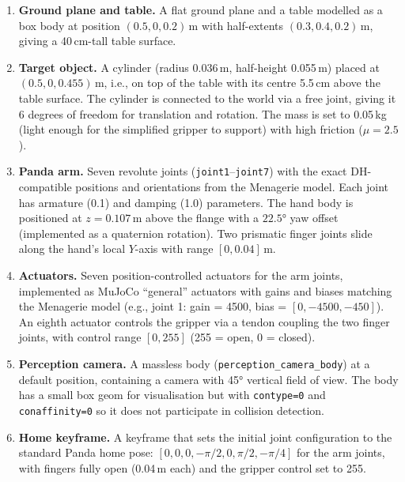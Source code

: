\documentclass[11pt,a4paper]{report}
\begin{document}
\begin{enumerate}
  \item \textbf{Ground plane and table.} A flat ground plane and a table modelled as a box body at position $(0.5, 0, 0.2)$\,m with half-extents $(0.3, 0.4, 0.2)$\,m, giving a 40\,cm-tall table surface.

  \item \textbf{Target object.} A cylinder (radius 0.036\,m, half-height 0.055\,m) placed at $(0.5, 0, 0.455)$\,m, i.e., on top of the table with its centre 5.5\,cm above the table surface. The cylinder is connected to the world via a free joint, giving it 6 degrees of freedom for translation and rotation. The mass is set to 0.05\,kg (light enough for the simplified gripper to support) with high friction ($\mu = 2.5$).

  \item \textbf{Panda arm.} Seven revolute joints (\texttt{joint1}--\texttt{joint7}) with the exact DH-compatible positions and orientations from the Menagerie model. Each joint has armature (0.1) and damping (1.0) parameters. The hand body is positioned at $z = 0.107$\,m above the flange with a $22.5°$ yaw offset (implemented as a quaternion rotation). Two prismatic finger joints slide along the hand's local $Y$-axis with range $[0, 0.04]$\,m.

  \item \textbf{Actuators.} Seven position-controlled actuators for the arm joints, implemented as MuJoCo ``general'' actuators with gains and biases matching the Menagerie model (e.g., joint 1: gain = 4500, bias = $[0, -4500, -450]$). An eighth actuator controls the gripper via a tendon coupling the two finger joints, with control range $[0, 255]$ (255 = open, 0 = closed).

  \item \textbf{Perception camera.} A massless body (\texttt{perception\_camera\_body}) at a default position, containing a camera with 45° vertical field of view. The body has a small box geom for visualisation but with \texttt{contype=0} and \texttt{conaffinity=0} so it does not participate in collision detection.

  \item \textbf{Home keyframe.} A keyframe that sets the initial joint configuration to the standard Panda home pose: $[0, 0, 0, -\pi/2, 0, \pi/2, -\pi/4]$ for the arm joints, with fingers fully open (0.04\,m each) and the gripper control set to 255.
\end{enumerate}
\end{document}

